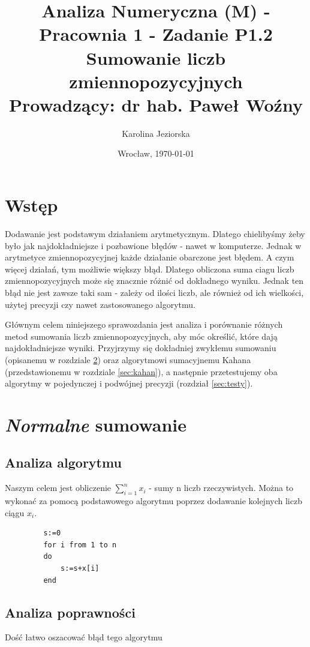 \documentclass[11pt]{article}
\date{Wrocław, \today}
\title{\LARGE\textbf{Analiza Numeryczna (M) - Pracownia 1 - Zadanie P1.2}\\Sumowanie liczb zmiennopozycyjnych\\\normalsize{Prowadzący: dr hab. Paweł Woźny}}
\author{Karolina Jeziorska}
\begin{document}
\maketitle

\newtheorem{tw}{Twierdzenie}
\newtheorem{alg}{Algorytm}


\thispagestyle{empty}     
\tableofcontents   

\section{Wstęp}
Dodawanie jest podstawym działaniem arytmetycznym. Dlatego chielibyśmy żeby było jak najdokładniejsze i pozbawione błędów - nawet w komputerze. Jednak w arytmetyce zmiennopozycyjnej każde działanie obarczone jest błędem. A czym więcej działań, tym możliwie większy błąd. Dlatego obliczona suma ciagu liczb zmiennopozycyjnych może się znacznie różnić od dokładnego wyniku. Jednak ten błąd nie jest zawsze taki sam - zależy od ilości liczb, ale również od ich wielkości, użytej precyzji czy nawet zastosowanego algorytmu.

Głównym celem niniejszego sprawozdania jest analiza i porównanie różnych metod sumowania liczb zmiennopozycyjnych, aby móc określić, które dają najdokładniejsze wyniki. Przyjrzymy się dokładniej zwykłemu sumowaniu (opisanemu w rozdziale \ref{sec:normal}) oraz algorytmowi sumacyjnemu Kahana (przedstawionemu w rozdziale \ref{sec:kahan}), a następnie przetestujemy oba algorytmy w pojedynczej i podwójnej precyzji (rozdział \ref{sec:testy}).


\section{\textit{Normalne} sumowanie}
\label{sec:normal}
\subsection{Analiza algorytmu}
Naszym celem jest obliczenie $\sum_{i=1}^{n}x_i$ - sumy n liczb rzeczywistych. Można to wykonać za pomocą podstawowego algorytmu poprzez dodawanie kolejnych liczb ciągu $x_i$.
\begin{verbatim}
         s:=0   
         for i from 1 to n
         do
             s:=s+x[i]
         end
\end{verbatim}

\subsection{Analiza poprawności}
Dość łatwo oszacować błąd tego algorytmu
\end{document}
